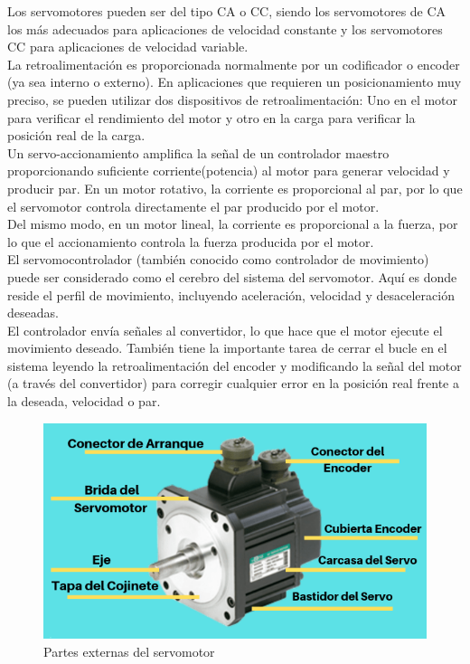 \documentclass[12pt,titlepage]{article}
\begin{document}
Los servomotores pueden ser del tipo CA o CC, siendo los servomotores de CA los más adecuados para aplicaciones de velocidad constante y los servomotores CC para aplicaciones de velocidad variable. \\ 

La retroalimentación es proporcionada normalmente por un codificador o encoder (ya sea interno o externo). En aplicaciones que requieren un posicionamiento muy preciso, se pueden utilizar dos dispositivos de retroalimentación: Uno en el motor para verificar el rendimiento del motor y otro en la carga para verificar la posición real de la carga. \\ 

Un servo-accionamiento amplifica la señal de un controlador maestro proporcionando suficiente corriente(potencia) al motor para generar velocidad y producir par. En un motor rotativo, la corriente es proporcional al par, por lo que el servomotor controla directamente el par producido por el motor. \\

Del mismo modo, en un motor lineal, la corriente es proporcional a la fuerza, por lo que el accionamiento controla la fuerza producida por el motor. \\ 

El servomocontrolador (también conocido como controlador de movimiento) puede ser considerado como el cerebro del sistema del servomotor. Aquí es donde reside el perfil de movimiento, incluyendo aceleración, velocidad y desaceleración deseadas.\\ 

El controlador envía señales al convertidor, lo que hace que el motor ejecute el movimiento deseado. También tiene la importante tarea de cerrar el bucle en el sistema leyendo la retroalimentación del encoder y modificando la señal del motor (a través del convertidor) para corregir cualquier error en la posición real frente a la deseada, velocidad o par. \\ 

\begin{figure}[htbp]
\hspace*{4.2cm} 
\includegraphics[scale=0.65]{PARTES_SERVO}
\caption{Partes externas del servomotor}
\end{figure}
\end{document}
